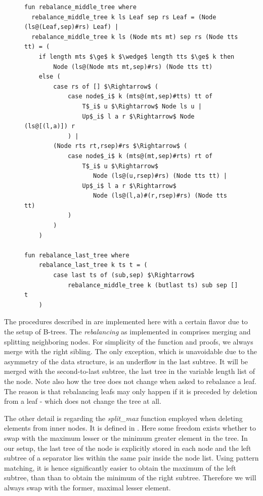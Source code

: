 \begin{figure}
\begin{lstlisting}[mathescape=true, language=Isabelle,label={lst:rebalance-def},
    caption={The rebalancing functions}]
fun rebalance_middle_tree where
  rebalance_middle_tree k ls Leaf sep rs Leaf = (Node (ls@(Leaf,sep)#rs) Leaf) |
  rebalance_middle_tree k ls (Node mts mt) sep rs (Node tts tt) = (
    if length mts $\ge$ k $\wedge$ length tts $\ge$ k then
        Node (ls@(Node mts mt,sep)#rs) (Node tts tt)
    else (
        case rs of [] $\Rightarrow$ (
            case node$_i$ k (mts@(mt,sep)#tts) tt of
                T$_i$ u $\Rightarrow$ Node ls u |
                Up$_i$ l a r $\Rightarrow$ Node (ls@[(l,a)]) r
            ) |
        (Node rts rt,rsep)#rs $\Rightarrow$ (
            case node$_i$ k (mts@(mt,sep)#rts) rt of
                T$_i$ u $\Rightarrow$
                   Node (ls@(u,rsep)#rs) (Node tts tt) |
                Up$_i$ l a r $\Rightarrow$
                   Node (ls@(l,a)#(r,rsep)#rs) (Node tts tt)
            )
        )
    )

fun rebalance_last_tree where
    rebalance_last_tree k ts t = (
        case last ts of (sub,sep) $\Rightarrow$
            rebalance_middle_tree k (butlast ts) sub sep [] t
    )
\end{lstlisting}
\end{figure}

The procedures described in 
are implemented here with a
certain flavor due to the setup of B-trees.
The \textit{rebalancing} as implemented in 
comprises merging and splitting neighboring nodes.
For simplicity of the function and proofs, we always
merge with the right sibling.
The only exception, which is unavoidable due to the asymmetry of the data structure,
is an underflow in the last subtree.
It will be merged with the second-to-last subtree, the last
tree in the variable length list of the node.
Note also how the tree does not change when asked to rebalance a leaf.
The reason is that rebalancing leafs may only happen if it is preceded
by deletion from a leaf - which does not change the tree at all.

The other detail is regarding the \textit{split\_max} function
employed when deleting elements from inner nodes.
It is defined in .
Here some freedom exists whether to swap with the maximum lesser
or the minimum greater element in the tree.
In our setup, the last tree of the node is explicitly stored in each node
and the left subtree of a separator lies within the same
pair inside the node list.
Using pattern matching, it is hence significantly
easier to obtain the maximum of the left subtree,
than than to obtain the minimum of the right subtree.
Therefore we will always swap with the former, maximal lesser element.

